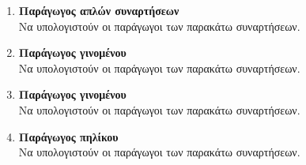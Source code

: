 \documentclass[twoside,nofonts,internet]{askhseis}
\begin{document}
\begin{enumerate}
\begin{multicols}{2}
\end{multicols}
\item \textbf{Παράγωγος απλών συναρτήσεων}\\
Να υπολογιστούν οι παράγωγοι των παρακάτω συναρτήσεων.
\begin{multicols}{2}
\end{multicols}
\item \textbf{Παράγωγος γινομένου}\\
Να υπολογιστούν οι παράγωγοι των παρακάτω συναρτήσεων.
\begin{multicols}{2}
\end{multicols}
\item \textbf{Παράγωγος γινομένου}\\
Να υπολογιστούν οι παράγωγοι των παρακάτω συναρτήσεων.
\item \textbf{Παράγωγος πηλίκου}\\
Να υπολογιστούν οι παράγωγοι των παρακάτω συναρτήσεων.

\end{enumerate}
\end{document}
